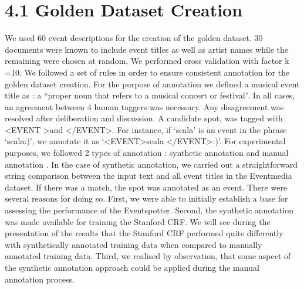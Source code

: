 \documentclass[a4paper,11pt]{report}
\begin{document}

\section*{4.1 Golden Dataset Creation}
We used 60 event descriptions for the creation of the golden dataset. 30 documents were known to include event titles as well as artist names while the remaining were chosen at random. We performed cross validation with factor k =10. We followed a set of rules in order to ensure consistent annotation for the golden dataset creation. For the purpose of annotation we defined a musical event title as : a ``proper noun that refers to a musical concert or festival''. In all cases, an agreement between 4 human taggers was necessary. Any disagreement was resolved after deliberation and discussion. A candidate spot, was tagged with \textless EVENT \textgreater and \textless /EVENT\textgreater. For instance, if `scala' is an event in the phrase `scala:)', we annotate it as `\textless EVENT\textgreater scala \textless /EVENT\textgreater:)'. For experimental purposes, we followed 2 types of annotation : synthetic annotation and manual annotation .
In the case of synthetic annotation, we carried out a straightforward string comparison between the input text and all event titles in the Eventmedia dataset. If there was a match, the spot was annotated as an event. There were several reasons for doing so. First, we were able to initially establish a base for assessing the performance of the Eventspotter. Second, the synthetic annotation was made available for training the Stanford CRF. We will see during the presentation of the results that the Stanford CRF performed quite differently with synthetically annotated training data when compared to manually annotated training data. Third, we realised by observation, that some aspect of the synthetic annotation approach could be applied during the manual annotation process.
\end{document}
